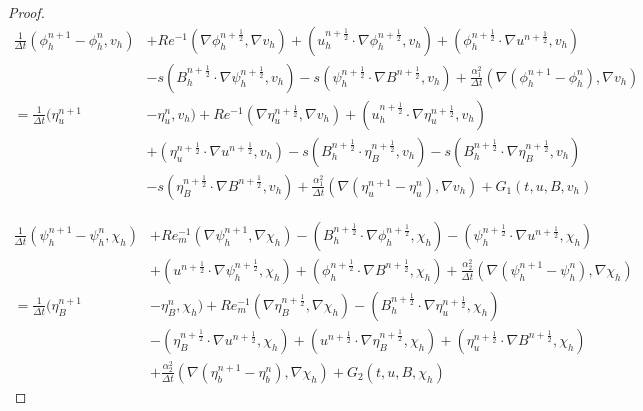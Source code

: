 \documentclass[11pt]{article}%
\numberwithin{equation}{section}
\def\grad{{\nabla}}
\def\nplushalf{{n+\frac12}}
\begin{document}
\begin{proof}
	\begin{equation}
	\begin{split}
	\frac{1}{\Delta t}(\phi^{n+1}_{h} - \phi^{n}_{h},v_{h}) & + Re^{-1}(\grad{\phi}^{\nplushalf}_{h},\grad{v}_{h}) + (u^{\nplushalf}_{h}\cdot\grad{\phi}^{\nplushalf}_{h},v_{h}) + (\phi^{\nplushalf}_{h}\cdot\grad{u}^{\nplushalf},v_{h}) \\
	&  - s(B^{\nplushalf}_{h}\cdot\grad{\psi}^{\nplushalf}_{h},v_{h})
	 - s(\psi^{\nplushalf}_{h}\cdot\grad{B}^{\nplushalf},v_{h}) +\frac{\alpha_1^2}{\Delta t}(\nabla (\phi^{n+1}_{h} - \phi^{n}_{h}),\grad{v}_{h})\\
	=\frac{1}{\Delta t}(\eta^{n+1}_{u}& - \eta^{n}_{u},v_{h}) + Re^{-1}(\grad{\eta}^{\nplushalf}_{u},\grad{v}_{h}) + (u^{\nplushalf}_{h}\cdot\grad{\eta}^{\nplushalf}_{u},v_{h}) \\
	& + (\eta^{\nplushalf}_{u}\cdot\grad{u}^{\nplushalf},v_{h}) - s(B^{\nplushalf}_{h}\cdot \eta^{\nplushalf}_{B},v_{h}) - s(B^{\nplushalf}_{h}\cdot\grad{\eta}^{\nplushalf}_{B},v_{h}) \\
	& - s(\eta^{\nplushalf}_{B}\cdot \grad{B}^{\nplushalf},v_{h})+\frac{\alpha_1^2}{\Delta t}(\nabla (\eta^{n+1}_{u} - \eta^{n}_{u}),\grad{v}_{h})
	+ G_{1}(t,u,B,v_{h})
	\end{split}
	\label{eq:3.45}
	\end{equation}
	
	\begin{equation}
	\begin{split}
	\frac{1}{\Delta t}(\psi^{n+1}_{h} - \psi^{n}_{h},\chi_{h}) & + Re^{-1}_{m}(\grad{\psi}^{n+1}_{h},\grad{\chi}_{h}) - (B^{\nplushalf}_{h}\cdot\grad{\phi}^{\nplushalf}_{h},\chi_{h}) - (\psi^{\nplushalf}_{h}\cdot\grad{u}^{\nplushalf},\chi_{h}) \\
	& + (u^{\nplushalf}\cdot\grad{\psi}^{\nplushalf}_{h},\chi_{h}) + (\phi^{\nplushalf}_{h}\cdot\grad{B}^{\nplushalf},\chi_{h})+\frac{\alpha_2^2}{\Delta t}(\nabla (\psi^{n+1}_{h} - \psi^{n}_{h}),\grad{\chi}_{h}) \\
	= \frac{1}{\Delta t}(\eta^{n+1}_{B} & - \eta^{n}_{B},\chi_{h}) + Re^{-1}_{m}(\grad{\eta}^{\nplushalf}_{B}, \grad{\chi}_{h}) - (B^{\nplushalf}_{h}\cdot \grad{\eta}^{\nplushalf}_{u},\chi_{h}) \\
	& - (\eta^{\nplushalf}_{B}\cdot\grad{u}^{\nplushalf},\chi_{h}) + (u^{\nplushalf}\cdot\grad{\eta}^{\nplushalf}_{B},\chi_{h}) + (\eta^{\nplushalf}_{u}\cdot\grad{B}^{\nplushalf},\chi_{h}) \\&+\frac{\alpha_2^2}{\Delta t}(\nabla (\eta^{n+1}_{b} - \eta^{n}_{b}),\grad{\chi}_{h}) 
	 + G_{2}(t,u,B,\chi_{h})
	\end{split}
	\label{eq:3.46}
	\end{equation}
	

\end{proof}
\end{document}
